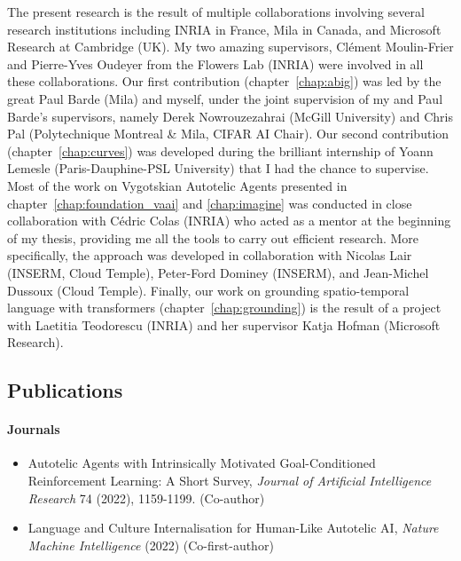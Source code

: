 The present research is the result of multiple collaborations involving several research institutions including INRIA in France, Mila in Canada, and Microsoft Research at Cambridge (UK). My two amazing supervisors, Clément Moulin-Frier and Pierre-Yves Oudeyer from the Flowers Lab (INRIA) were involved in all these collaborations. Our first contribution (chapter~\ref{chap:abig}) was led by the great Paul Barde (Mila) and myself, under the joint supervision of my and Paul Barde's supervisors, namely Derek Nowrouzezahrai (McGill University) and Chris Pal (Polytechnique Montreal \& Mila, CIFAR AI Chair). Our second contribution (chapter~\ref{chap:curves}) was developed during the brilliant internship of Yoann Lemesle (Paris-Dauphine-PSL University) that I had the chance to supervise. Most of the work on Vygotskian Autotelic Agents presented in chapter~\ref{chap:foundation_vaai} and \ref{chap:imagine} was conducted in close collaboration with C\'edric Colas (INRIA) who acted as a mentor at the beginning of my thesis, providing me all the tools to carry out efficient research. More specifically, the \imagine approach was developed in collaboration with Nicolas Lair (INSERM, Cloud Temple), Peter-Ford Dominey (INSERM), and Jean-Michel Dussoux (Cloud Temple). Finally, our work on grounding spatio-temporal language with transformers (chapter~\ref{chap:grounding}) is the result of a project with Laetitia Teodorescu (INRIA) and her supervisor Katja Hofman (Microsoft Research).  

\newpage

\subsection{Publications}

\paragraph{Journals}
\begin{itemize}
\item Autotelic Agents with Intrinsically Motivated Goal-Conditioned Reinforcement Learning: A Short Survey, \textit{Journal of Artificial Intelligence Research} 74 (2022), 1159-1199. \cite{colas2021intrinsically} (Co-author)
\item Language and Culture Internalisation for Human-Like Autotelic AI, \textit{Nature Machine Intelligence} (2022) \cite{colas2022language} (Co-first-author)
\end{itemize}


